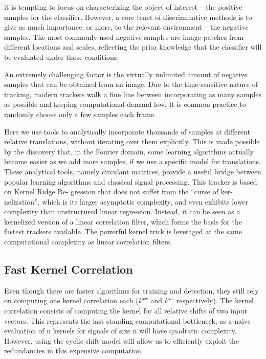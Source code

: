 	it  is  tempting  to  focus  on  characterizing  the  object  of
	interest  –  the  positive  samples  for  the  classifier.  However,
	a  core  tenet  of  discriminative  methods  is  to  give  as  much
	importance,  or  more,  to  the  relevant  environment  –  the
	negative samples. The most commonly used negative samples are image patches from different locations and scales,
	reflecting  the  prior  knowledge  that  the  classifier  will  be
	evaluated under those conditions.
	
	An  extremely  challenging  factor  is  the  virtually  unlimited amount of negative samples that can be obtained from
	an  image.  Due  to  the  time-sensitive  nature  of  tracking,
	modern  trackers  walk  a  fine  line  between  incorporating
	as  many  samples  as  possible  and  keeping  computational
	demand low. It is common practice to randomly choose only
	a few samples each frame.
	
	Here we use tools to analytically incorporate thousands of samples at different relative translations, without iterating over them
	explicitly. This is made possible by the discovery that, in the
	Fourier domain, some learning algorithms actually become
	easier as we add more samples, if we use a specific model for translations.
	These  analytical  tools,  namely  circulant  matrices,  provide  a  useful  bridge  between  popular  learning  algorithms
	and  classical  signal  processing. This tracker is based  on  Kernel  Ridge  Re-
	gression  that  does  not  suffer  from  the  “curse  of  ker-
	nelization”,  which  is  its  larger  asymptotic  complexity,  and
	even  exhibits  lower  complexity  than  unstructured  linear
	regression.  Instead,  it  can  be  seen  as  a  kernelized  version
	of  a  linear  correlation  filter,  which  forms  the  basis  for  the
	fastest  trackers  available.  The  powerful  kernel  trick is leveraged at  the  same  computational  complexity  as
	linear correlation filters.
	
	\subsection{Fast Kernel Correlation}
	
	Even though there are faster algorithms for training and detection, they still rely on computing one kernel correlation each ($k^{xx}$ and $k^{xz}$ respectively). The kernel
	correlation consists of computing the kernel for all relative shifts of two input vectors. This represents the last standing computational bottleneck, as a naive evaluation of n  kernels for signals of size n will have quadratic complexity. However, using the cyclic shift model will allow us to efficiently exploit the redundancies in this expensive computation.
	

